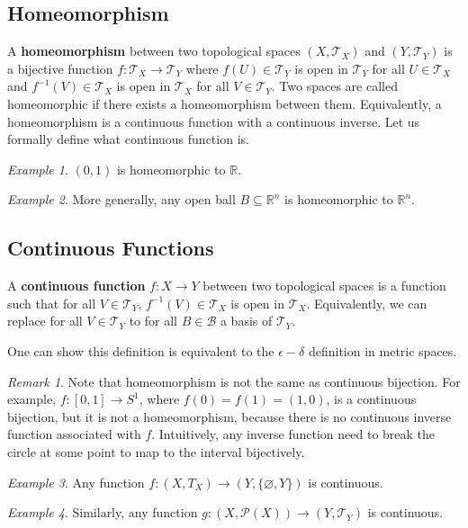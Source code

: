 \documentclass[article,11pt, reqno]{article}
\theoremstyle{remark}
\newtheorem*{remark}{Remark}
\newtheorem*{example}{Example}
\newcommand{\tb}{\textbf}
\newcommand{\mb}{\mathbb}
\newcommand{\mc}{\mathcal}
\newcommand{\<}{\langle}
\renewcommand{\>}{\rangle}
\begin{document}
\subsection*{Homeomorphism}
A \tb{homeomorphism} between two topological spaces $(X, \mc T_X)$ and $(Y, \mc T_Y)$ is a bijective function $f: \mc T_X\rightarrow \mc T_Y$ where $f(U)\in\mc T_Y$ is open in $\mc T_Y$ for all $U\in \mc T_X$ and $f^{-1}(V)\in\mc T_X$ is open in $\mc T_X$ for all $V\in \mc T_Y$. Two spaces are called homeomorphic if there exists a homeomorphism between them. Equivalently, a homeomorphism is a continuous function with a continuous inverse. Let us formally define what continuous function is.

\begin{example}
    $(0,1)$ is homeomorphic to $\mb R$.
\end{example}
\begin{example}
    More generally, any open ball $B\subseteq \mb R^n$ is homeomorphic to $\mb R^n$.
\end{example}

\subsection*{Continuous Functions}
A \tb{continuous function} $f: X\rightarrow Y$ between two topological spaces is a function such that for all $V\in\mc T_Y$, $f^{-1}(V)\in\mc T_X$ is open in $\mc T_X$. Equivalently, we can replace for all $V\in\mc T_Y$ to for all $B\in\mc B$ a basis of $\mc T_Y$.

One can show this definition is equivalent to the $\epsilon-\delta$ definition in metric spaces.
\begin{remark}
    Note that homeomorphism is not the same as continuous bijection. For example, $f:[0, 1]\rightarrow S^1$, where $f(0)=f(1)=(1, 0)$, is a continuous bijection, but it is not a homeomorphism, because there is no continuous inverse function associated with $f$. Intuitively, any inverse function need to break the circle at some point to map to the interval bijectively.
\end{remark}
\begin{example}
    Any function $f:(X, T_X)\rightarrow (Y, \{\varnothing, Y\})$ is continuous. 
\end{example}
\begin{example}
    Similarly, any function $g: (X, \mc P(X))\rightarrow (Y, \mc T_Y)$ is continuous.
\end{example}
\end{document}
